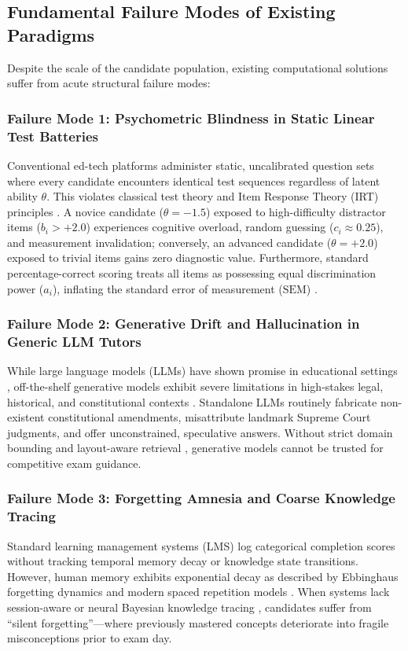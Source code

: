 \documentclass[conference]{IEEEtran}
\begin{document}
\subsection{Fundamental Failure Modes of Existing Paradigms}
Despite the scale of the candidate population, existing computational solutions suffer from acute structural failure modes:

\subsubsection{Failure Mode 1: Psychometric Blindness in Static Linear Test Batteries}
Conventional ed-tech platforms administer static, uncalibrated question sets where every candidate encounters identical test sequences regardless of latent ability $\theta$. This violates classical test theory and Item Response Theory (IRT) principles \cite{Lord1980,Birnbaum1968}. A novice candidate ($\theta = -1.5$) exposed to high-difficulty distractor items ($b_i > +2.0$) experiences cognitive overload, random guessing ($c_i \approx 0.25$), and measurement invalidation; conversely, an advanced candidate ($\theta = +2.0$) exposed to trivial items gains zero diagnostic value. Furthermore, standard percentage-correct scoring treats all items as possessing equal discrimination power ($a_i$), inflating the standard error of measurement ($\text{SEM}$) \cite{BockMislevy1982,Shin2025,Zhuang2026}.

\subsubsection{Failure Mode 2: Generative Drift and Hallucination in Generic LLM Tutors}
While large language models (LLMs) have shown promise in educational settings \cite{Albadarin2024,Hevia2025,Kestin2025,Bai2025}, off-the-shelf generative models exhibit severe limitations in high-stakes legal, historical, and constitutional contexts \cite{Yan2024}. Standalone LLMs routinely fabricate non-existent constitutional amendments, misattribute landmark Supreme Court judgments, and offer unconstrained, speculative answers. Without strict domain bounding and layout-aware retrieval \cite{Lewis2020,Wang2024}, generative models cannot be trusted for competitive exam guidance.

\subsubsection{Failure Mode 3: Forgetting Amnesia and Coarse Knowledge Tracing}
Standard learning management systems (LMS) log categorical completion scores without tracking temporal memory decay or knowledge state transitions. However, human memory exhibits exponential decay as described by Ebbinghaus forgetting dynamics and modern spaced repetition models \cite{Wozniak1990,SettlesMeeder2016}. When systems lack session-aware or neural Bayesian knowledge tracing \cite{CorbettAnderson1995,Ke2024,Liang2024,BadrinathPardos2025,Jung2025}, candidates suffer from ``silent forgetting''---where previously mastered concepts deteriorate into fragile misconceptions prior to exam day.
\end{document}

